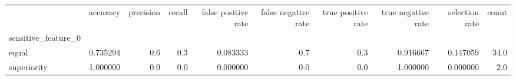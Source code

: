 \begin{tabular}{lrrrrrrrrr}
\toprule
{} &  accuracy &  precision &  recall &  false positive rate &  false negative rate &  true positive rate &  true negative rate &  selection rate &  count \\
sensitive\_feature\_0 &           &            &         &                      &                      &                     &                     &                 &        \\
\midrule
equal               &  0.735294 &        0.6 &     0.3 &             0.083333 &                  0.7 &                 0.3 &            0.916667 &        0.147059 &   34.0 \\
superiority         &  1.000000 &        0.0 &     0.0 &             0.000000 &                  0.0 &                 0.0 &            1.000000 &        0.000000 &    2.0 \\
\bottomrule
\end{tabular}
